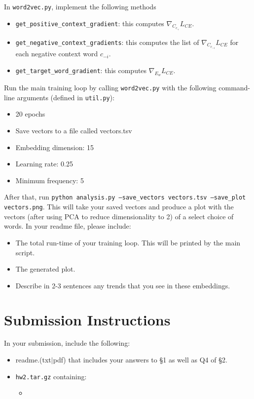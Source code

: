 \documentclass[11pt]{article}
\begin{document}
\vspace{2em}
 In \texttt{word2vec.py}, implement the following methods
\begin{itemize}
  \item \texttt{get\_positive\_context\_gradient}: this computes $\nabla_{C_{c_+}} L_{CE}$.
  \item \texttt{get\_negative\_context\_gradients}: this computes the list of $\nabla_{C_{c_{-i}}} L_{CE}$ for each negative context word $c_{-i}$.
  \item \texttt{get\_target\_word\_gradient}: this computes $\nabla_{E_w} L_{CE}$.
\end{itemize}

\vspace{2em}
 Run the main training loop by calling \texttt{word2vec.py} with the following command-line arguments (defined in \texttt{util.py}):
\begin{itemize}
  \item 20 epochs
  \item Save vectors to a file called vectors.tsv
  \item Embedding dimension: 15
  \item Learning rate: 0.25
  \item Minimum frequency: 5
\end{itemize}
After that, run \texttt{python analysis.py --save\_vectors vectors.tsv --save\_plot vectors.png}.  This will take your saved vectors and produce a plot with the vectors (after using PCA to reduce dimensionality to 2) of a select choice of words.  In your readme file, please include: 
\begin{itemize}
  \item The total run-time of your training loop.  This will be printed by the main script.
  \item The generated plot.
  \item Describe in 2-3 sentences any trends that you see in these embeddings.
\end{itemize}


\section*{Submission Instructions}

In your submission, include the following:
\begin{itemize}
  \item readme.(txt$\mid$pdf) that includes your answers to \S1 as well as Q4 of \S2. 
  \item \texttt{hw2.tar.gz} containing:
  \begin{itemize}
    \item 
  \end{itemize}
\end{itemize}
\end{document}
